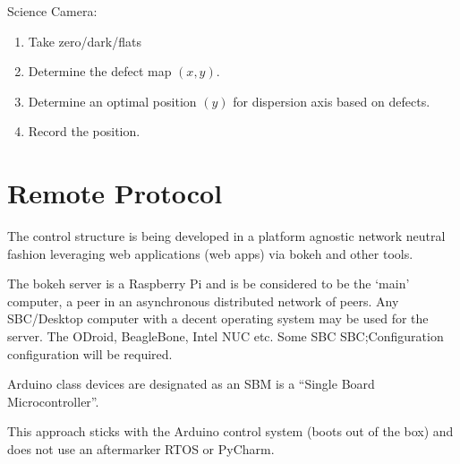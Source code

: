 \documentclass[letterpaper,10pt,english,openany,oneside]{sphinxmanual}
\begin{document}
\sphinxAtStartPar
Science Camera:
\begin{enumerate}
%
\item {} 
\sphinxAtStartPar
Take zero/dark/flats

\item {} 
\sphinxAtStartPar
Determine the defect map \((x,y)\).

\item {} 
\sphinxAtStartPar
Determine an optimal position \((y)\) for dispersion axis based on defects.

\item {} 
\sphinxAtStartPar
Record the position.

\end{enumerate}


\chapter{Remote Protocol}
\label{\detokenize{protocol:remote-protocol}}\label{\detokenize{protocol::doc}}
\sphinxAtStartPar
The control structure is being developed in a platform agnostic network
neutral fashion leveraging web applications (web apps) via bokeh and
other tools.

\sphinxAtStartPar
The bokeh server is a Raspberry Pi and is be considered to be the
‘main’ computer, a peer in an asynchronous distributed network of
peers. Any SBC/Desktop computer with a decent operating system may be
used for the server. The ODroid, BeagleBone, Intel NUC etc. Some SBC
SBC;Configuration configuration will be required.

\sphinxAtStartPar
Arduino class devices are designated as an SBM is a “Single Board
Microcontroller”.

\sphinxAtStartPar
This approach sticks with the Arduino control system (boots out of the
box) and does not use an after\sphinxhyphen{}marker RTOS or PyCharm.
\end{document}
